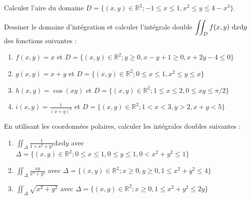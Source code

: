 \begin{exercise} %
    Calculer l'aire du domaine $D = \{(x,y)\in\mathbb{R}^2;-1\leq x\leq 1,x^2\leq y\leq4-x^3\}$.
\end{exercise}

\begin{exercise} %
    Dessiner le domaine d'intégration et calculer l'intégrale double $\displaystyle\iint_Df(x,y) \ \displaystyle \mathrm{d}x \displaystyle \mathrm{d}y$ des fonctions suivantes :
    \begin{enumerate}[label=(\alph*)]
        \item $f(x,y) = x$ et $D=\{(x,y)\in\mathbb{R}^2;y\geq0,x-y+1\geq0,x+2y-4\leq0\}$
        \item $g(x,y) = x+y$ et $D=\{(x,y)\in\mathbb{R}^2;0\leq x\leq1,x^2\leq y\leq x\}$
        \item $h(x,y)=\cos(xy)$ et $D=\{(x,y)\in\mathbb{R}^2;1\leq x\leq 2,0\leq xy\leq \pi/2\}$
        \item $i(x,y) =\displaystyle\frac{1}{(x+y)^3}$ et $D=\{(x,y)\in\mathbb{R}^2;1<x<3,y>2,x+y<5\}$
    \end{enumerate}
\end{exercise}

\begin{exercise} %
    En utilisant les coordonnées polaires, calculer les intégrales doubles suivantes :
    \begin{enumerate}[label=(\alph*)]
        \item $\displaystyle\iint_\Delta \frac{1}{1+x^2+y^2}{\mathrm d}x{\mathrm d}y$ avec $\Delta = \{(x,y)\in\mathbb{R}^2;0\leq x\leq 1,0\leq y\leq1,0<x^2+y^2\leq1\}$
        \item $\displaystyle\iint_\Delta \frac{xy}{x^2+y^2}$ avec $\Delta=\{(x,y)\in\mathbb{R}^2;x\geq0,y\geq0,1\leq x^2+y^2\leq4\}$
        \item $\displaystyle\iint_\Delta \sqrt{x^2+y^2}$ avec $\Delta=\{(x,y)\in\mathbb{R}^2;x\geq0,1\leq x^2+y^2\leq 2y\}$
    \end{enumerate}
\end{exercise}